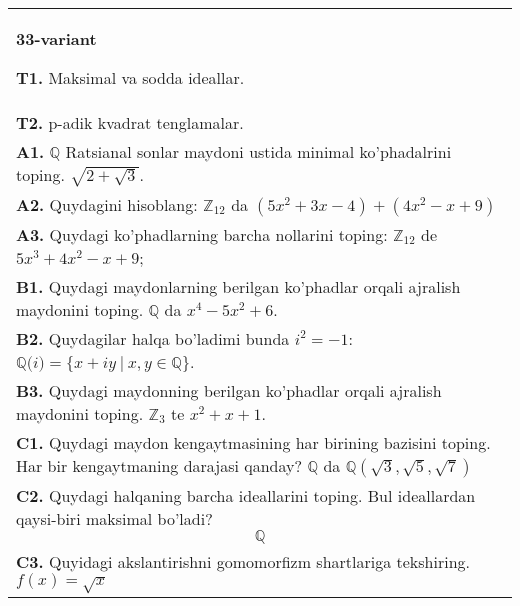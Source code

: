 \documentclass{article}
\begin{document}
\begin{tabular}{m{17cm}}
\textbf{33-variant}
\newline

\textbf{T1.} Maksimal va sodda ideallar. \\
\textbf{T2.} p-adik kvadrat tenglamalar. \\
\textbf{A1.} \(\mathbb{Q}\) Ratsianal sonlar maydoni ustida minimal ko'phadalrini toping.
\(\sqrt{2 + \sqrt{3}}\). \\
\textbf{A2.} Quydagini hisoblang:
\(\mathbb{Z}_{12}\) da \(\left( 5x^{2} + 3x - 4 \right) + \left( 4x^{2} - x + 9 \right)\) \\
\textbf{A3.} Quydagi ko'phadlarning barcha nollarini toping:
\(\mathbb{Z}_{12}\) de \(5x^{3} + 4x^{2} - x + 9\); \\
\textbf{B1.} Quydagi maydonlarning berilgan ko'phadlar orqali ajralish maydonini toping.
\(\mathbb{Q}\) da \(x^{4} - 5x^{2} + 6\). \\
\textbf{B2.} Quydagilar halqa bo'ladimi bunda \(i^{2} = - 1\):
\(\mathbb{Q(}i) = \{ x + iy\ |\ x,y \in \mathbb{Q\}}\). \\
\textbf{B3.} Quydagi maydonning berilgan ko'phadlar orqali ajralish maydonini toping.
\(\mathbb{Z}_{3}\) te \(x^{2} + x + 1\). \\
\textbf{C1.} Quydagi maydon kengaytmasining har birining bazisini toping. Har bir kengaytmaning darajasi qanday?
\(\mathbb{Q}\) da \(\mathbb{Q}\left( \sqrt{3},\sqrt{5},\sqrt{7} \right)\) \\
\textbf{C2.} Quydagi halqaning barcha ideallarini toping. Bul ideallardan qaysi-biri maksimal bo'ladi?
\[\mathbb{Q}\] \\
\textbf{C3.} Quyidagi akslantirishni gomomorfizm shartlariga tekshiring. \(f(x) = \sqrt{x}\) \\

\end{tabular}
\vspace{1cm}
\end{document}
